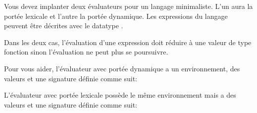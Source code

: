 \begin{Exercise}
\label{ex:implantation_portee}
Vous devez implanter deux évaluateurs pour un langage minimaliste. L'un aura la
portée lexicale et l'autre la portée dynamique. Les expressions du langage
peuvent être décrites avec le datatype .

Dans les deux cas, l'évaluation d'une expression
 doit réduire
 à une valeur de type fonction sinon
l'évaluation ne peut plus se poursuivre.

Pour vous aider, l'évaluateur avec portée dynamique
a un environnement, des valeurs et une signature définie comme suit:

L'évaluateur avec portée lexicale possède le même environnement mais a
des valeurs et une signature définie comme suit:
\end{Exercise}

\begin{Answer}[ref={ex:implantation_portee}]
\end{Answer}